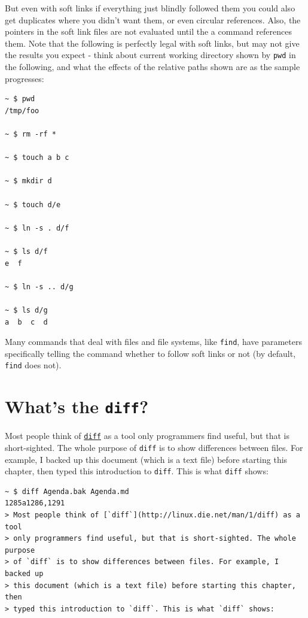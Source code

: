 \documentclass[10pt,]{book}
\numberwithin{figure}{chapter}
\begin{document}
But even with soft links if everything just blindly followed them you
could also get duplicates where you didn't want them, or even circular
references. Also, the pointers in the soft link files are not evaluated
until the a command references them. Note that the following is
perfectly legal with soft links, but may not give the results you expect
- think about current working directory shown by \texttt{pwd} in the
following, and what the effects of the relative paths shown are as the
sample progresses:

\begin{verbatim}
~ $ pwd
/tmp/foo

~ $ rm -rf *

~ $ touch a b c

~ $ mkdir d

~ $ touch d/e

~ $ ln -s . d/f

~ $ ls d/f
e  f

~ $ ln -s .. d/g

~ $ ls d/g
a  b  c  d
\end{verbatim}

Many commands that deal with files and file systems, like \texttt{find},
have parameters specifically telling the command whether to follow soft
links or not (by default, \texttt{find} does not).

\section{What's the \texttt{diff}?}\label{whats-the-diff}

Most people think of
\href{http://linux.die.net/man/1/diff}{\texttt{diff}} as a tool only
programmers find useful, but that is short-sighted. The whole purpose of
\texttt{diff} is to show differences between files. For example, I
backed up this document (which is a text file) before starting this
chapter, then typed this introduction to \texttt{diff}. This is what
\texttt{diff} shows:

\begin{verbatim}
~ $ diff Agenda.bak Agenda.md
1285a1286,1291
> Most people think of [`diff`](http://linux.die.net/man/1/diff) as a tool
> only programmers find useful, but that is short-sighted. The whole purpose
> of `diff` is to show differences between files. For example, I backed up
> this document (which is a text file) before starting this chapter, then
> typed this introduction to `diff`. This is what `diff` shows:
\end{verbatim}
\end{document}
